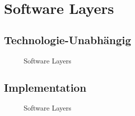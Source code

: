 \section{Software Layers}

\subsection*{Technologie-Unabhängig}

\begin{figure}[ht!]
	\centering{
		\resizebox{0.9\textwidth}{!} {
			
		}
	}

	\caption{Software Layers}
\end{figure}

\newpage
\subsection*{Implementation}

\begin{figure}[ht!]
	\centering{
		\resizebox{0.9\textwidth}{!} {
			
		}
	}

	\caption{Software Layers}
\end{figure}